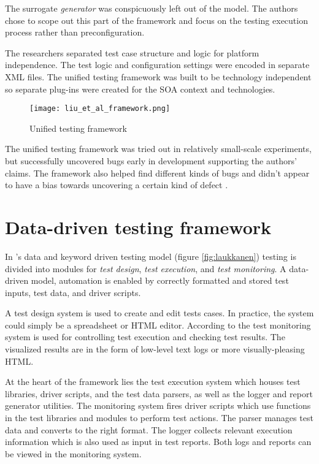 \documentclass[12pt,a4paper,oneside,pdftex]{report}
\begin{document}
The surrogate \emph{generator} was conspicuously left out of the model. The authors chose to scope out this part of the framework and focus on the testing execution process rather than preconfiguration.

The researchers separated test case structure and logic for platform independence. The test logic and configuration settings were encoded in separate XML files. The unified testing framework was built to be technology independent so 
separate plug-ins were created for the SOA context and technologies.

\begin{figure}[H]
  \begin{center}
    \texttt{[image: liu\_et\_al\_framework.png]}
    \caption{Unified testing framework \citep{liu2009unified}}
    \label{fig:liu}
  \end{center}
\end{figure}

The unified testing framework was tried out in relatively small-scale experiments, but successfully uncovered bugs early in development supporting the authors' claims. The framework also helped find different kinds of bugs and didn't appear to have a bias towards uncovering a certain kind of defect \citep{liu2009unified}.

\section{Data-driven testing framework}

In \citeauthor{laukkanen2006data}'s \citeyearpar{laukkanen2006data} data and keyword driven testing model (figure \ref{fig:laukkanen}) testing is divided into modules for \emph{test design}, \emph{test execution}, and \emph{test monitoring}. A data-driven model, automation is enabled by correctly formatted and stored test inputs, test data, and driver scripts.

A test design system is used to create and edit tests cases. In practice, the system could simply be a spreadsheet or HTML editor. According to \citet{laukkanen2006data} the test monitoring system is used for controlling test execution and checking test results. The visualized results are in the form of low-level text logs or more visually-pleasing HTML.

At the heart of the framework lies the test execution system which houses test libraries, driver scripts, and the test data parsers, as well as the logger and report generator utilities. The monitoring system fires driver scripts which use functions in the test libraries and modules to perform test actions. The parser manages test data and converts to the right format. The logger collects relevant execution information which is also used as input in test reports. Both logs and reports can be viewed in the monitoring system. \citep{laukkanen2006data}
\end{document}
